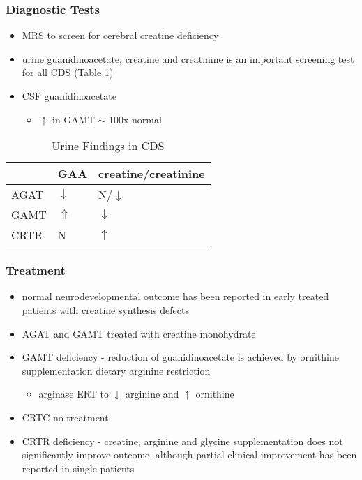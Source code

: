 \documentclass[12pt]{scrartcl}
\begin{document}
\subsubsection{Diagnostic Tests}
\label{sec:org95180ae}
\begin{itemize}
\item MRS to screen for cerebral creatine deficiency
\item urine guanidinoacetate, creatine and creatinine is an important
screening test for all CDS (Table \ref{tab:org0390996})
\item CSF guanidinoacetate
\begin{itemize}
\item \(\uparrow\) in GAMT \(\sim\) 100x normal
\end{itemize}
\end{itemize}



\begin{table}[htbp]
\caption{\label{tab:org0390996}Urine Findings in CDS}
\centering
\begin{tabular}{lll}
 & GAA & creatine/creatinine\\
\hline
AGAT & \(\downarrow\) & N/\(\downarrow\)\\
GAMT & \(\Uparrow\) & \(\downarrow\)\\
CRTR & N & \(\uparrow\)\\
\end{tabular}
\end{table}

\subsubsection{Treatment}
\label{sec:org369c406}
\begin{itemize}
\item normal neurodevelopmental outcome has been reported in early treated
patients with creatine synthesis defects
\item AGAT and GAMT treated with creatine monohydrate
\item GAMT deficiency - reduction of guanidinoacetate is achieved by
ornithine supplementation \textpm{} dietary arginine restriction
\begin{itemize}
\item arginase ERT to \(\downarrow\) arginine and \(\uparrow\) ornithine
\end{itemize}
\item CRTC no treatment
\item CRTR deficiency - creatine, arginine and glycine supplementation
does not significantly improve outcome, although partial clinical
improvement has been reported in single patients
\end{itemize}
\end{document}

